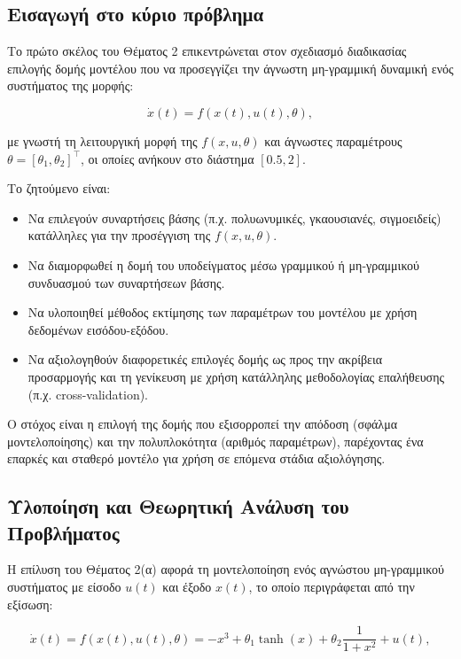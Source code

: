 \documentclass[a4paper,12pt]{report}
\newcommand{\en}{\selectlanguage{english}}
\newcommand{\gr}{\selectlanguage{greek}}
\begin{document}
\subsection{Εισαγωγή στο κύριο πρόβλημα}

Το πρώτο σκέλος του Θέματος 2 επικεντρώνεται στον σχεδιασμό διαδικασίας επιλογής δομής μοντέλου που να προσεγγίζει την άγνωστη μη-γραμμική δυναμική ενός συστήματος της μορφής:

\[
\dot{x}(t) = f(x(t), u(t), \theta),
\]

\hspace{-0.6cm}με γνωστή τη λειτουργική μορφή της $f(x,u,\theta)$ και άγνωστες παραμέτρους $\theta = [\theta_1, \theta_2]^\top$, οι οποίες ανήκουν στο διάστημα $[0.5, 2]$.

\hspace{-0.6cm}Το ζητούμενο είναι:
\begin{itemize}
    \item Να επιλεγούν συναρτήσεις βάσης (π.χ. πολυωνυμικές, γκαουσιανές, σιγμοειδείς) κατάλληλες για την προσέγγιση της $f(x,u,\theta)$.
    \item Να διαμορφωθεί η δομή του υποδείγματος μέσω γραμμικού ή μη-γραμμικού συνδυασμού των συναρτήσεων βάσης.
    \item Να υλοποιηθεί μέθοδος εκτίμησης των παραμέτρων του μοντέλου με χρήση δεδομένων εισόδου-εξόδου.
    \item Να αξιολογηθούν διαφορετικές επιλογές δομής ως προς την ακρίβεια προσαρμογής και τη γενίκευση με χρήση κατάλληλης μεθοδολογίας επαλήθευσης (π.χ. \en cross-validation\gr).
\end{itemize}

\hspace{-0.6cm}Ο στόχος είναι η επιλογή της δομής που εξισορροπεί την απόδοση (σφάλμα μοντελοποίησης) και την πολυπλοκότητα (αριθμός παραμέτρων), παρέχοντας ένα επαρκές και σταθερό μοντέλο για χρήση σε επόμενα στάδια αξιολόγησης.

\subsection{Υλοποίηση και Θεωρητική Ανάλυση του Προβλήματος}

Η επίλυση του Θέματος 2(α) αφορά τη μοντελοποίηση ενός αγνώστου μη-γραμμικού συστήματος με είσοδο $u(t)$ και έξοδο $x(t)$, το οποίο περιγράφεται από την εξίσωση:

\[
\dot{x}(t) = f(x(t), u(t), \theta) = -x^3 + \theta_1 \tanh(x) + \theta_2 \frac{1}{1 + x^2} + u(t),
\]
\end{document}
